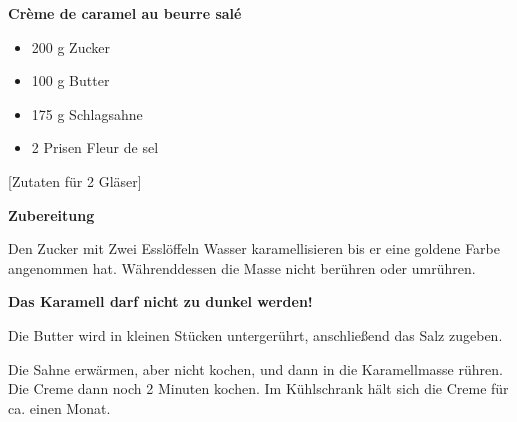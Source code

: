 

\parindent0pt	

\pagestyle{empty}


\textbf{\LARGE{Crème de caramel au beurre salé}}%

\hrulefill



\vspace{0,5 cm}
\vspace*{\fill}
\begin{multicols}{2}	


\begin{itemize}
\item 200 g Zucker
\item 100 g Butter
\item 175 g Schlagsahne
\item 2 Prisen Fleur de sel
\end{itemize}
\end{multicols}
\vfill									%

\vspace{1cm}
%
\begin{center}
%
[Zutaten für 2 Gläser]%
\end{center}



\vfill
\newpage
\textbf{{\LARGE Zubereitung}}%

\hrulefill

\vspace*{\fill}
\begin{multicols}{2}


Den Zucker mit Zwei Esslöffeln Wasser karamellisieren bis er eine goldene Farbe angenommen hat.
Währenddessen die Masse nicht berühren oder umrühren.\newline

\textbf{Das Karamell darf nicht zu dunkel werden!}\newline

Die Butter wird in kleinen Stücken untergerührt, anschließend das Salz zugeben.\newline

Die Sahne erwärmen, aber nicht kochen, und dann in die Karamellmasse rühren.\newline
Die Creme dann noch 2 Minuten kochen.\newline
Im Kühlschrank hält sich die Creme für ca. einen Monat.









\end{multicols}
\vfill
